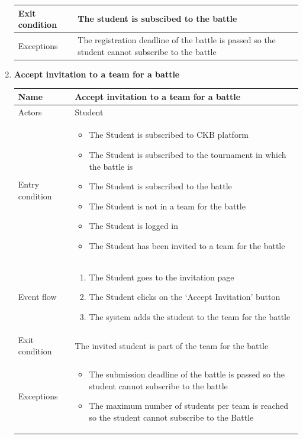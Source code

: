 \begin{enumerate}[label=UC\arabic*:]
\begin{tabular}{|p{3cm}|p{8cm}|}
        \hline
        Exit condition & The student is subscibed to the battle \\
        \hline
        Exceptions & The registration deadline of the battle is passed so the student cannot subscribe to the battle \\
        \hline
    \end{tabular}
    \item \textbf{Accept invitation to a team for a battle} \\
    \begin{tabular}{|p{3cm}|p{8cm}|}
        \hline
        Name & Accept invitation to a team for a battle \\
        \hline
        Actors & Student \\
        \hline
        Entry condition &
        \begin{itemize}
            \item The Student is subscribed to CKB platform
            \item The Student is subscribed to the tournament in which the battle is
            \item The Student is subscribed to the battle
            \item The Student is not in a team for the battle
            \item The Student is logged in
            \item The Student has been invited to a team for the battle
        \end{itemize} \\
        \hline
        Event flow &
        \begin{enumerate}[label=\arabic*.]
            \item The Student goes to the invitation page
            \item The Student clicks on the `Accept Invitation' button
            \item The system adds the student to the team for the battle
        \end{enumerate} \\
        \hline
        Exit condition & The invited student is part of the team for the battle \\
        \hline
        Exceptions &
        \begin{itemize}
            \item The submission deadline of the battle is passed so the student cannot subscribe to the battle
            \item The maximum number of students per team is reached so the student cannot subscribe to the Battle

\end{itemize}
\end{tabular}
\end{enumerate}
